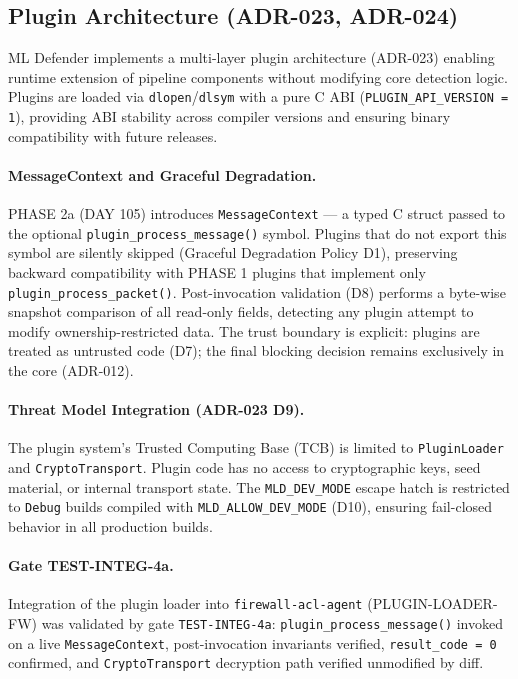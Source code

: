 \documentclass[11pt,a4paper]{article}
\begin{document}
    \subsection{Plugin Architecture (ADR-023, ADR-024)}

    ML Defender implements a multi-layer plugin architecture (ADR-023) enabling runtime extension
    of pipeline components without modifying core detection logic. Plugins are loaded via
    \texttt{dlopen}/\texttt{dlsym} with a pure C ABI (\texttt{PLUGIN\_API\_VERSION = 1}),
    providing ABI stability across compiler versions and ensuring binary compatibility with
    future releases.

    \paragraph{MessageContext and Graceful Degradation.}
    PHASE 2a (DAY 105) introduces \texttt{MessageContext} --- a typed C struct passed to the
    optional \texttt{plugin\_process\_message()} symbol. Plugins that do not export this symbol
    are silently skipped (Graceful Degradation Policy D1), preserving backward compatibility with
    PHASE 1 plugins that implement only \texttt{plugin\_process\_packet()}. Post-invocation
    validation (D8) performs a byte-wise snapshot comparison of all read-only fields, detecting
    any plugin attempt to modify ownership-restricted data. The trust boundary is explicit: plugins
    are treated as untrusted code (D7); the final blocking decision remains exclusively in the
    core (ADR-012).

    \paragraph{Threat Model Integration (ADR-023 D9).}
    The plugin system's Trusted Computing Base (TCB) is limited to \texttt{PluginLoader} and
    \texttt{CryptoTransport}. Plugin code has no access to cryptographic keys, seed material,
    or internal transport state. The \texttt{MLD\_DEV\_MODE} escape hatch is restricted to
    \texttt{Debug} builds compiled with \texttt{MLD\_ALLOW\_DEV\_MODE} (D10), ensuring
    fail-closed behavior in all production builds.

    \paragraph{Gate TEST-INTEG-4a.}
    Integration of the plugin loader into \texttt{firewall-acl-agent} (PLUGIN-LOADER-FW) was
    validated by gate \texttt{TEST-INTEG-4a}: \texttt{plugin\_process\_message()} invoked on a
    live \texttt{MessageContext}, post-invocation invariants verified, \texttt{result\_code = 0}
    confirmed, and \texttt{CryptoTransport} decryption path verified unmodified by diff.
\end{document}
